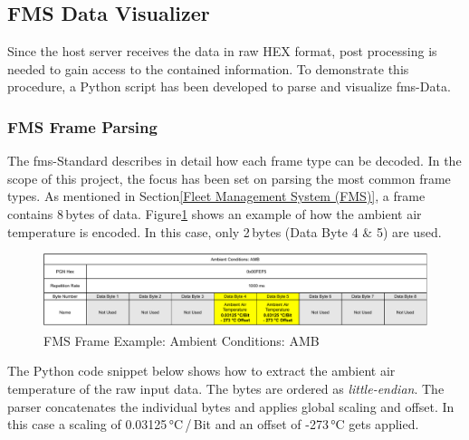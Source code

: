 \subsection{FMS Data Visualizer}
Since the host server receives the data in raw HEX format, post processing is needed to gain access to the contained information. To demonstrate this procedure, a Python script has been developed to parse and visualize \acrshort{fms}-Data. 

\subsubsection{FMS Frame Parsing}
The \acrshort{fms}-Standard describes in detail how each frame type can be decoded. In the scope of this project, the focus has been set on parsing the most common frame types. As mentioned in Section\;\ref{Fleet Management System (FMS)}, a frame contains 8\,bytes of data. Figure\;\ref{fig:fms_frame_example} shows an example of how the ambient air temperature is encoded. In this case, only 2\,bytes (Data Byte 4 \& 5) are used. 

\begin{figure}[h!]
	\centering
	\includegraphics[width=\textwidth]{images/fms_frame_example}
	\caption{FMS Frame Example: Ambient Conditions: AMB \cite{fms-standard-description}}
	\label{fig:fms_frame_example}
\end{figure}

The Python code snippet below shows how to extract the ambient air temperature of the raw input data. The bytes are ordered as \textit{little-endian}. The parser concatenates the individual bytes and applies global scaling and offset. In this case a scaling of 0.03125\,°C\,/\,Bit and an offset of -273\,°C gets applied.

